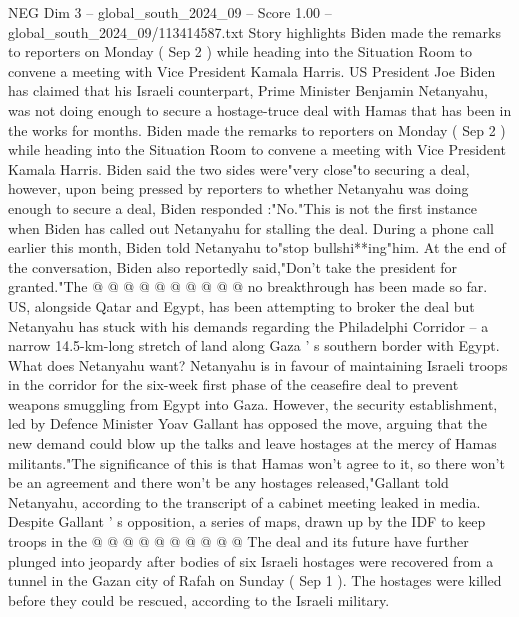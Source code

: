 \begin{textsample}{NEG Dim 3 – global\_south\_2024\_09 – Score 1.00 – global\_south\_2024\_09/113414587.txt}  \label{ex:f3_neg_139}
Story highlights Biden made the remarks to reporters on Monday ( Sep 2 ) while heading into the Situation Room to convene a meeting with Vice President Kamala Harris.
US President Joe Biden has claimed that his Israeli counterpart, Prime Minister Benjamin Netanyahu, was not doing enough to secure a hostage-truce deal with Hamas that has been in the works for months.
Biden made the remarks to reporters on Monday ( Sep 2 ) while heading into the Situation Room to convene a meeting with Vice President Kamala Harris.
Biden said the two sides were"very close"to securing a deal, however, upon being pressed by reporters to whether Netanyahu was doing enough to secure a deal, Biden responded :"No."This is not the first instance when Biden has called out Netanyahu for stalling the deal.
During a phone call earlier this month, Biden told Netanyahu to"stop bullshi**ing"him.
At the end of the conversation, Biden also reportedly said,"Don't take the president for granted."The @ @ @ @ @ @ @ @ @ @ no breakthrough has been made so far.
US, alongside Qatar and Egypt, has been attempting to broker the deal but Netanyahu has stuck with his demands regarding the Philadelphi Corridor -- a narrow 14.5-km-long stretch of land along Gaza ' s southern border with Egypt.
What does Netanyahu want?
Netanyahu is in favour of maintaining Israeli troops in the corridor for the six-week first phase of the ceasefire deal to prevent weapons smuggling from Egypt into Gaza.
However, the security establishment, led by Defence Minister Yoav Gallant has opposed the move, arguing that the new demand could blow up the talks and leave hostages at the mercy of Hamas militants."The significance of this is that Hamas won't agree to it, so there won't be an agreement and there won't be any hostages released,"Gallant told Netanyahu, according to the transcript of a cabinet meeting leaked in media.
Despite Gallant ' s opposition, a series of maps, drawn up by the IDF to keep troops in the @ @ @ @ @ @ @ @ @ @ The deal and its future have further plunged into jeopardy after bodies of six Israeli hostages were recovered from a tunnel in the Gazan city of Rafah on Sunday ( Sep 1 ).
The hostages were killed before they could be rescued, according to the Israeli military.

\end{textsample}
